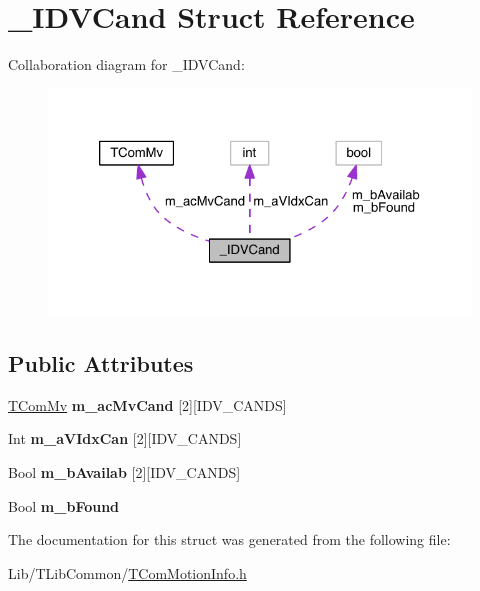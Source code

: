 \hypertarget{struct___i_d_v_cand}{}\section{\+\_\+\+I\+D\+V\+Cand Struct Reference}
\label{struct___i_d_v_cand}


Collaboration diagram for \+\_\+\+I\+D\+V\+Cand\+:
\nopagebreak
\begin{figure}[H]
\begin{center}
\leavevmode
\includegraphics[width=326pt]{dd/d3c/struct___i_d_v_cand__coll__graph}
\end{center}
\end{figure}
\subsection*{Public Attributes}
\begin{DoxyCompactItemize}
\item 
\mbox{\label{struct___i_d_v_cand_aa6d8d7ce9ed9a39a859e93d04d8054b5}} 
\hyperlink{class_t_com_mv}{T\+Com\+Mv} {\bfseries m\+\_\+ac\+Mv\+Cand} \mbox{[}2\mbox{]}\mbox{[}I\+D\+V\+\_\+\+C\+A\+N\+DS\mbox{]}
\item 
\mbox{\label{struct___i_d_v_cand_a4ae26ca3b63cb0d083dc2ce650a43433}} 
Int {\bfseries m\+\_\+a\+V\+Idx\+Can} \mbox{[}2\mbox{]}\mbox{[}I\+D\+V\+\_\+\+C\+A\+N\+DS\mbox{]}
\item 
\mbox{\label{struct___i_d_v_cand_a184082dee69556b4161c01e582847dc1}} 
Bool {\bfseries m\+\_\+b\+Availab} \mbox{[}2\mbox{]}\mbox{[}I\+D\+V\+\_\+\+C\+A\+N\+DS\mbox{]}
\item 
\mbox{\label{struct___i_d_v_cand_a07df957b4920d84789de56535979bc4a}} 
Bool {\bfseries m\+\_\+b\+Found}
\end{DoxyCompactItemize}


The documentation for this struct was generated from the following file\+:\begin{DoxyCompactItemize}
\item 
Lib/\+T\+Lib\+Common/\hyperlink{_t_com_motion_info_8h}{T\+Com\+Motion\+Info.\+h}\end{DoxyCompactItemize}
